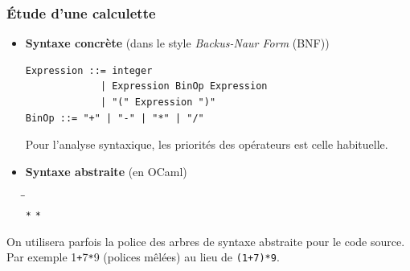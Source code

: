 %
\begin{frame}[containsverbatim]
\frametitle{Étude d'une calculette}

\begin{itemize}

  \item \textbf{Syntaxe concrète} (dans le style
    \emph{Backus-Naur Form} (BNF))
     {\small
   \begin{verbatim}
Expression ::= integer
             | Expression BinOp Expression
             | "(" Expression ")"
BinOp ::= "+" | "-" | "*" | "/"
    \end{verbatim}
    }%
    Pour l'analyse syntaxique, les priorités des opérateurs est celle
    habituelle.

  \item \textbf{Syntaxe abstraite} (en OCaml)
    {\small
     \begin{tabbing}
     \Xtype {} \= \equal \=  \Xof
     \\
     \> \vbar \>  \Xof {} \texttt{*}
      \texttt{*} \\
     \Xand {} \equal {} \vbar {}
     \vbar {} \vbar {}\semi{}
     \end{tabbing}
    }
\end{itemize}

\remarque \quad On utilisera parfois la police des arbres de syntaxe
abstraite pour le code source. Par exemple
\lpar\num{1}\texttt{+}\num{7}\rpar\texttt{*}\num{9} (polices mêlées)
au lieu de \texttt{(1+7)*9}.

\end{frame}

